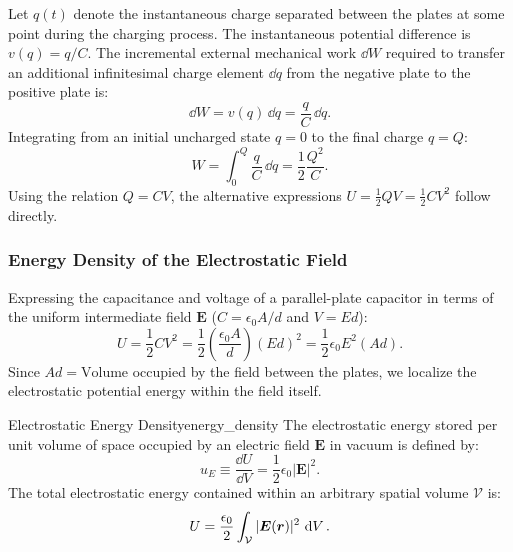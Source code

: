 \begin{proofbox}
Let \(q(t)\) denote the instantaneous charge separated between the plates at some point during the charging process. The instantaneous potential difference is \(v(q) = q/C\). The incremental external mechanical work \(\dd{W}\) required to transfer an additional infinitesimal charge element \(\dd{q}\) from the negative plate to the positive plate is:
\begin{equation}
    \dd{W} = v(q)\,\dd{q} = \frac{q}{C}\,\dd{q}.
\end{equation}
Integrating from an initial uncharged state \(q = 0\) to the final charge \(q = Q\):
\begin{equation}
    W = \int_0^Q \frac{q}{C}\,\dd{q} = \frac{1}{2}\frac{Q^2}{C}.
\end{equation}
Using the relation \(Q = CV\), the alternative expressions \(U = \frac{1}{2}QV = \frac{1}{2}CV^2\) follow directly.
\end{proofbox}

\subsubsection{Energy Density of the Electrostatic Field}

Expressing the capacitance and voltage of a parallel-plate capacitor in terms of the uniform intermediate field \(\bm{E}\) (\(C = \epsilon_0 A / d\) and \(V = E d\)):
\begin{equation}
    U = \frac{1}{2} C V^2 = \frac{1}{2} \left(\frac{\epsilon_0 A}{d}\right) (E d)^2 = \frac{1}{2}\epsilon_0 E^2 (A d).
\end{equation}
Since \(A d = \text{Volume}\) occupied by the field between the plates, we localize the electrostatic potential energy within the field itself.

\begin{definition}{Electrostatic Energy Density}{energy_density}
The electrostatic energy stored per unit volume of space occupied by an electric field \(\bm{E}\) in vacuum is defined by:
\begin{equation}
    u_E \equiv \frac{\dd{U}}{\dd{V}} = \frac{1}{2}\epsilon_0 |\bm{E}|^2.
\end{equation}
The total electrostatic energy contained within an arbitrary spatial volume \(\mathcal{V}\) is:
\begin{equation}
    U = \frac{\epsilon_0}{2} \int_{\mathcal{V}} |\bm{E}(\bm{r})|^2\,\dd{V}.
\end{equation}
\end{definition}

